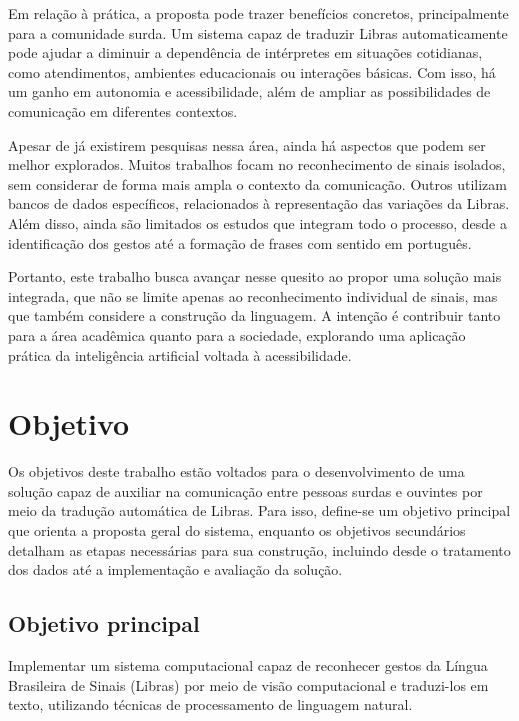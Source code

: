 \documentclass[
    12pt,                %
    openright,           %
    oneside,             %
    a4paper,             %
    english,             %
    brazil               %
]{abntex2}
\begin{document}
Em relação à prática, a proposta pode trazer benefícios concretos, principalmente para a comunidade surda. Um sistema capaz de traduzir Libras automaticamente pode ajudar a diminuir a dependência de intérpretes em situações cotidianas, como atendimentos, ambientes educacionais ou interações básicas. Com isso, há um ganho em autonomia e acessibilidade, além de ampliar as possibilidades de comunicação em diferentes contextos.

Apesar de já existirem pesquisas nessa área, ainda há aspectos que podem ser melhor explorados. Muitos trabalhos focam no reconhecimento de sinais isolados, sem considerar de forma mais ampla o contexto da comunicação. Outros utilizam bancos de dados específicos, relacionados à representação das variações da Libras. Além disso, ainda são limitados os estudos que integram todo o processo, desde a identificação dos gestos até a formação de frases com sentido em português.

Portanto, este trabalho busca avançar nesse quesito ao propor uma solução mais integrada, que não se limite apenas ao reconhecimento individual de sinais, mas que também considere a construção da linguagem. A intenção é contribuir tanto para a área acadêmica quanto para a sociedade, explorando uma aplicação prática da inteligência artificial voltada à acessibilidade.

\section{Objetivo}
\label{sec:objetivo}

Os objetivos deste trabalho estão voltados para o desenvolvimento de uma solução capaz de auxiliar na comunicação entre pessoas surdas e ouvintes por meio da tradução automática de Libras. Para isso, define-se um objetivo principal que orienta a proposta geral do sistema, enquanto os objetivos secundários detalham as etapas necessárias para sua construção, incluindo desde o tratamento dos dados até a implementação e avaliação da solução.

\subsection{Objetivo principal}

Implementar um sistema computacional capaz de reconhecer gestos da Língua Brasileira de Sinais (Libras) por meio de visão computacional e traduzi-los em texto, utilizando técnicas de processamento de linguagem natural.
\end{document}

